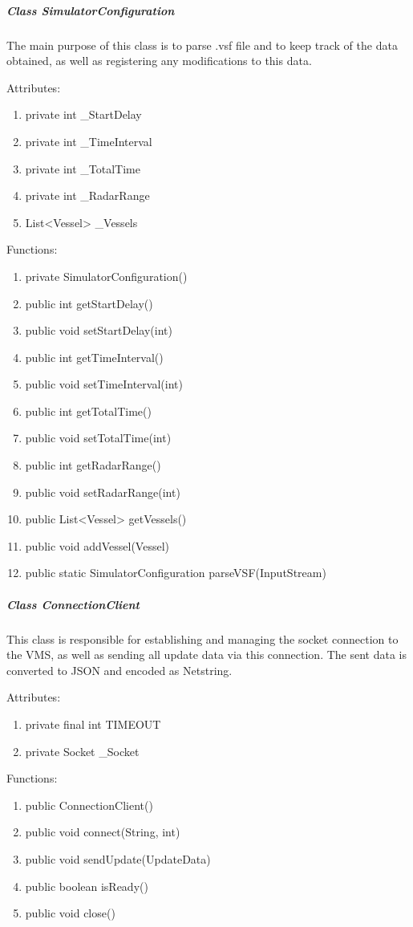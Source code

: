 \documentclass{article}
\begin{document}
\subparagraph{Class SimulatorConfiguration}
The main purpose of this class is to parse .vsf file and to keep track of the data obtained, as well as registering any modifications to this data.

Attributes:
\begin{enumerate}
	\item private int _StartDelay
    \item private int _TimeInterval
    \item private int _TotalTime
    \item private int _RadarRange
    \item List<Vessel> _Vessels
\end {enumerate}

Functions:
\begin{enumerate}
	\item private SimulatorConfiguration()
	\item public int getStartDelay()
	\item public void setStartDelay(int)
	\item public int getTimeInterval()
	\item public void setTimeInterval(int)
	\item public int getTotalTime()
	\item public void setTotalTime(int)
	\item public int getRadarRange()
	\item public void setRadarRange(int)
	\item public List<Vessel> getVessels()
	\item public void addVessel(Vessel)
	\item public static SimulatorConfiguration parseVSF(InputStream)
\end{enumerate}

\subparagraph{Class ConnectionClient}
This class is responsible for establishing and managing the socket connection to the VMS, as well as sending all update data via this connection. The sent data is converted to JSON and encoded as Netstring.

Attributes:
\begin{enumerate}
	\item private final int TIMEOUT
    \item private Socket _Socket
\end {enumerate}

Functions:
\begin{enumerate}
	\item public ConnectionClient()
	\item public void connect(String, int)
	\item public void sendUpdate(UpdateData)
	\item public boolean isReady()
	\item public void close()
\end{enumerate}
\end{document}
